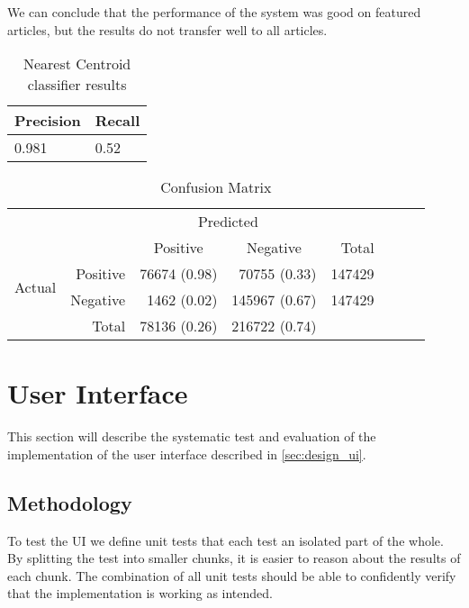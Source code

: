 We can conclude that the performance of the system was good on featured articles, but the results do not transfer well to all articles.

\begin{table}[htbp]
\centering
\begin{tabular}{@{}ll@{}}
\toprule
Precision     & Recall       \\ \midrule
\num{0.981} & \num{0.52} \\
\bottomrule
\end{tabular}
\caption[Nearest Centroid classifier results]{Nearest Centroid classifier results}\label{eval-results}
\end{table}

\begin{table}[htbp]
    \centering
     \begin{tabular}{rrrrrrrr}
      \toprule
      \multicolumn{2}{c}{} & \multicolumn{2}{c}{Predicted} & \\
      \cmidrule{3-4}
      \multicolumn{2}{c}{} & \multicolumn{1}{c}{Positive} & \multicolumn{1}{c}{Negative} & Total \\
      \midrule
      \multirow{2}{*}{Actual} & Positive & \num{76674} (0.98) & \num{70755} (0.33)  & \num{147429} \\
                              & Negative & \num{1462} (0.02)  & \num{145967} (0.67) & \num{147429} \\
                              \cmidrule{1-2}
                              & Total    & \num{78136} (0.26) & \num{216722} (0.74) \\
      \bottomrule
    \end{tabular}
    \caption[Confusion Matrix]{Confusion Matrix}%
    \label{tab:confusionmatrix}
\end{table}

\section{User Interface}
This section will describe the systematic test and evaluation of the implementation of the user interface described in \cref{sec:design_ui}.

\subsection{Methodology}
To test the UI we define unit tests that each test an isolated part of the whole. By splitting the test into smaller chunks, it is easier to reason about the results of each chunk. The combination of all unit tests should be able to confidently verify that the implementation is working as intended.


